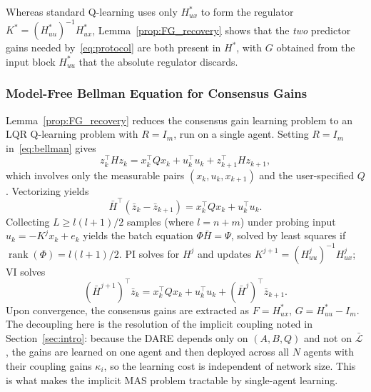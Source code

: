\documentclass[12pt]{elsarticle}
\theoremstyle{remark}
\DeclareMathOperator{\rank}{rank}
\begin{document}
Whereas standard Q-learning uses only $H_{ux}^*$ to form the regulator $K^*=(H_{uu}^*)^{-1}H_{ux}^*$, Lemma~\ref{prop:FG_recovery} shows that the \emph{two} predictor gains needed by~\eqref{eq:protocol} are both present in $H^*$, with $G$ obtained from the input block $H_{uu}^*$ that the absolute regulator discards.
\subsubsection{Model-Free Bellman Equation for Consensus Gains}
\label{subsec:sf_bellman}
Lemma~\ref{prop:FG_recovery} reduces the consensus gain learning problem to an LQR Q-learning problem with $R = I_m$, run on a single agent. Setting $R = I_m$ in~\eqref{eq:bellman} gives
\begin{equation}
z_k^\top H z_k = x_k^\top Q x_k + u_k^\top u_k + z_{k+1}^\top H z_{k+1},
\label{eq:bellman_consensus}
\end{equation}
which involves only the measurable pairs $(x_k, u_k, x_{k+1})$ and the user-specified $Q$. Vectorizing yields
\begin{equation}
\bar{H}^\top (\bar{z}_k - \bar{z}_{k+1}) = x_k^\top Q x_k + u_k^\top u_k.
\label{eq:bellman_vec}
\end{equation}
Collecting $L \geq l(l+1)/2$ samples (where $l = n + m$) under probing input $u_k = -K^j x_k + e_k$ yields the batch equation $\Phi \bar{H} = \Psi$, solved by least squares if $\rank(\Phi) = l(l+1)/2$. PI solves for $H^j$ and updates $K^{j+1} = (H_{uu}^j)^{-1} H_{ux}^j$; VI solves
\begin{equation}
(\bar{H}^{j+1})^\top \bar{z}_k = x_k^\top Q x_k + u_k^\top u_k + (\bar{H}^j)^\top \bar{z}_{k+1}.
\label{eq:vi_update}
\end{equation}
Upon convergence, the consensus gains are extracted as $F = H_{ux}^*$, $G = H_{uu}^* - I_m$.
The decoupling here is the resolution of the implicit coupling noted in Section~\ref{sec:intro}: because the DARE depends only on $(A,B,Q)$ and not on $\bar{\mathcal{L}}$, the gains are learned on one agent and then deployed across all $N$ agents with their coupling gains $\kappa_i$, so the learning cost is independent of network size. This is what makes the implicit MAS problem tractable by single-agent learning.
\end{document}
